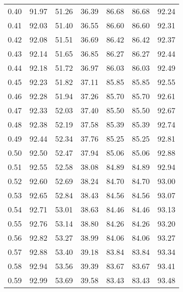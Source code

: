 \begin{tabular}{|c|c|c|c|c|c|c|}
      0.40 &     91.97 &     51.26 &      36.39 &   86.68 &      86.68 &         92.24 \\
      0.41 &     92.03 &     51.40 &      36.55 &   86.60 &      86.60 &         92.31 \\
      0.42 &     92.08 &     51.51 &      36.69 &   86.42 &      86.42 &         92.37 \\
      0.43 &     92.14 &     51.65 &      36.85 &   86.27 &      86.27 &         92.44 \\
      0.44 &     92.18 &     51.72 &      36.97 &   86.03 &      86.03 &         92.49 \\
      0.45 &     92.23 &     51.82 &      37.11 &   85.85 &      85.85 &         92.55 \\
      0.46 &     92.28 &     51.94 &      37.26 &   85.70 &      85.70 &         92.61 \\
      0.47 &     92.33 &     52.03 &      37.40 &   85.50 &      85.50 &         92.67 \\
      0.48 &     92.38 &     52.19 &      37.58 &   85.39 &      85.39 &         92.74 \\
      0.49 &     92.44 &     52.34 &      37.76 &   85.25 &      85.25 &         92.81 \\
      0.50 &     92.50 &     52.47 &      37.94 &   85.06 &      85.06 &         92.88 \\
      0.51 &     92.55 &     52.58 &      38.08 &   84.89 &      84.89 &         92.94 \\
      0.52 &     92.60 &     52.69 &      38.24 &   84.70 &      84.70 &         93.00 \\
      0.53 &     92.65 &     52.84 &      38.43 &   84.56 &      84.56 &         93.07 \\
      0.54 &     92.71 &     53.01 &      38.63 &   84.46 &      84.46 &         93.13 \\
      0.55 &     92.76 &     53.14 &      38.80 &   84.26 &      84.26 &         93.20 \\
      0.56 &     92.82 &     53.27 &      38.99 &   84.06 &      84.06 &         93.27 \\
      0.57 &     92.88 &     53.40 &      39.18 &   83.84 &      83.84 &         93.34 \\
      0.58 &     92.94 &     53.56 &      39.39 &   83.67 &      83.67 &         93.41 \\
      0.59 &     92.99 &     53.69 &      39.58 &   83.43 &      83.43 &         93.48 \\

\end{tabular}
